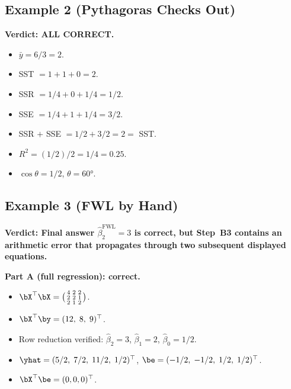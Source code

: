 
\subsection*{Example 2 (Pythagoras Checks Out)}

\textbf{Verdict: ALL CORRECT.}

\begin{itemize}[nosep]
  \item $\bar{y} = 6/3 = 2$. \checkmark
  \item SST $= 1+1+0 = 2$. \checkmark
  \item SSR $= 1/4+0+1/4 = 1/2$. \checkmark
  \item SSE $= 1/4+1+1/4 = 3/2$. \checkmark
  \item SSR $+$ SSE $= 1/2+3/2 = 2 =$ SST. \checkmark
  \item $R^2 = (1/2)/2 = 1/4 = 0.25$. \checkmark
  \item $\cos\theta = 1/2$, $\theta = 60°$. \checkmark
\end{itemize}



\subsection*{Example 3 (FWL by Hand)}

\textbf{Verdict: Final answer $\hat\beta_2^{\text{FWL}} = 3$ is correct,
but Step~B3 contains an arithmetic error that propagates through two
subsequent displayed equations.}

\medskip
\noindent\textbf{Part A (full regression): correct.}
\begin{itemize}[nosep]
  \item $\bX^\top\bX = \bigl(\begin{smallmatrix}4&2&2\\2&2&1\\2&1&2\end{smallmatrix}\bigr)$. \checkmark
  \item $\bX^\top\by = (12,\;8,\;9)^\top$. \checkmark
  \item Row reduction verified: $\hat\beta_2=3$, $\hat\beta_1=2$, $\hat\beta_0=1/2$. \checkmark
  \item $\yhat = (5/2,\;7/2,\;11/2,\;1/2)^\top$, $\be = (-1/2,\;-1/2,\;1/2,\;1/2)^\top$. \checkmark
  \item $\bX^\top\be = (0,0,0)^\top$. \checkmark
\end{itemize}

